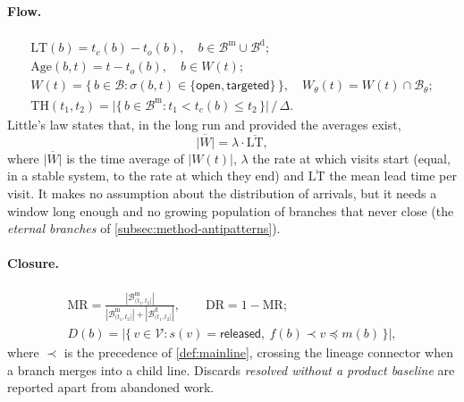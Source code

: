 \paragraph{Flow.}
\begin{gather}
  \mathrm{LT}(b) = t_c(b) - t_o(b), \quad b \in \mathcal{B}^{\mathrm{m}} \cup \mathcal{B}^{\mathrm{d}};
  \label{eq:leadtime}\\
  \mathrm{Age}(b,t) = t - t_o(b), \quad b \in W(t);
  \label{eq:age}\\
  W(t) = \{\, b \in \mathcal{B} : \sigma(b,t) \in \{\textsf{open}, \textsf{targeted}\} \,\},
  \quad W_\theta(t) = W(t) \cap \mathcal{B}_\theta;
  \label{eq:wip}\\
  \mathrm{TH}(t_1,t_2) = \bigl|\{\, b \in \mathcal{B}^{\mathrm{m}} : t_1 < t_c(b) \le t_2 \,\}\bigr| \,/\, \Delta .
  \label{eq:throughput}
\end{gather}
Little's law \citep{little1961} states that, in the long run and provided
the averages exist,
\begin{equation}
  \overline{|W|} = \lambda \cdot \overline{\mathrm{LT}},
  \label{eq:little}
\end{equation}
where $\overline{|W|}$ is the time average of $|W(t)|$, $\lambda$ the rate
at which visits start (equal, in a stable system, to the rate at which
they end) and $\overline{\mathrm{LT}}$ the mean lead time per visit. It
makes no assumption about the distribution of arrivals, but it needs a
window long enough and no growing population of branches that never close
(the \emph{eternal branches} of \cref{subsec:method-antipatterns}).

\paragraph{Closure.}
\begin{gather}
  \mathrm{MR} = \frac{|\mathcal{B}^{\mathrm{m}}_{(t_1,t_2]}|}
    {|\mathcal{B}^{\mathrm{m}}_{(t_1,t_2]}| + |\mathcal{B}^{\mathrm{d}}_{(t_1,t_2]}|},
  \qquad \mathrm{DR} = 1-\mathrm{MR};
  \label{eq:mergeratio}\\
  D(b) = \bigl|\{\, v \in \mathcal{V} : s(v)=\textsf{released},\ f(b) \prec v \preceq m(b) \,\}\bigr| ,
  \label{eq:mergedistance}
\end{gather}
where $\prec$ is the precedence of \cref{def:mainline}, crossing the
lineage connector when a branch merges into a child line. Discards
\emph{resolved without a product baseline} are reported apart from
abandoned work.

